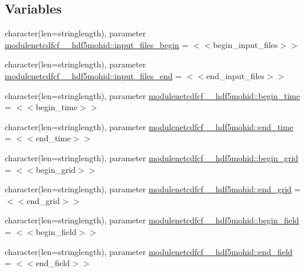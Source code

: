 \subsection*{Variables}
\begin{DoxyCompactItemize}
\item 
character(len=stringlength), parameter \mbox{\hyperlink{namespacemodulenetcdfcf__2__hdf5mohid_af2722b62dfba20d4b796f0f27d82fd31}{modulenetcdfcf\+\_\+\_\+hdf5mohid\+::input\+\_\+files\+\_\+begin}} = \textquotesingle{}$<$$<$begin\+\_\+input\+\_\+files$>$$>$\textquotesingle{}
\item 
character(len=stringlength), parameter \mbox{\hyperlink{namespacemodulenetcdfcf__2__hdf5mohid_a5dcc549a17ea43615db8980b538175aa}{modulenetcdfcf\+\_\+\_\+hdf5mohid\+::input\+\_\+files\+\_\+end}} = \textquotesingle{}$<$$<$end\+\_\+input\+\_\+files$>$$>$\textquotesingle{}
\item 
character(len=stringlength), parameter \mbox{\hyperlink{namespacemodulenetcdfcf__2__hdf5mohid_a3ee1f28e49bbf7583bea10e71cd5a00f}{modulenetcdfcf\+\_\+\_\+hdf5mohid\+::begin\+\_\+time}} = \textquotesingle{}$<$$<$begin\+\_\+time$>$$>$\textquotesingle{}
\item 
character(len=stringlength), parameter \mbox{\hyperlink{namespacemodulenetcdfcf__2__hdf5mohid_a55cdff7cefd036166241d8c51ed98a44}{modulenetcdfcf\+\_\+\_\+hdf5mohid\+::end\+\_\+time}} = \textquotesingle{}$<$$<$end\+\_\+time$>$$>$\textquotesingle{}
\item 
character(len=stringlength), parameter \mbox{\hyperlink{namespacemodulenetcdfcf__2__hdf5mohid_aa0402f413b24d352700b89425a9e8fc9}{modulenetcdfcf\+\_\+\_\+hdf5mohid\+::begin\+\_\+grid}} = \textquotesingle{}$<$$<$begin\+\_\+grid$>$$>$\textquotesingle{}
\item 
character(len=stringlength), parameter \mbox{\hyperlink{namespacemodulenetcdfcf__2__hdf5mohid_a7cac99729ac9050630f294b103bd8802}{modulenetcdfcf\+\_\+\_\+hdf5mohid\+::end\+\_\+grid}} = \textquotesingle{}$<$$<$end\+\_\+grid$>$$>$\textquotesingle{}
\item 
character(len=stringlength), parameter \mbox{\hyperlink{namespacemodulenetcdfcf__2__hdf5mohid_aac283ad6dfec7b5769037bc1906cf217}{modulenetcdfcf\+\_\+\_\+hdf5mohid\+::begin\+\_\+field}} = \textquotesingle{}$<$$<$begin\+\_\+field$>$$>$\textquotesingle{}
\item 
character(len=stringlength), parameter \mbox{\hyperlink{namespacemodulenetcdfcf__2__hdf5mohid_ac1d1a6545e333d0284482ad0b31b7d7c}{modulenetcdfcf\+\_\+\_\+hdf5mohid\+::end\+\_\+field}} = \textquotesingle{}$<$$<$end\+\_\+field$>$$>$\textquotesingle{}

\end{DoxyCompactItemize}
